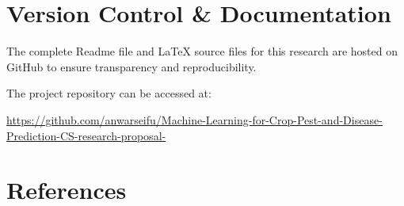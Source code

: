 \documentclass[12pt,a4paper]{article}
\begin{document}
\section{Version Control \& Documentation}

The complete Readme file and LaTeX source files for this research are hosted on GitHub to ensure transparency and reproducibility. 

The project repository can be accessed at:
\begin{flushleft}
    \footnotesize \url{https://github.com/anwarseifu/Machine-Learning-for-Crop-Pest-and-Disease-Prediction-CS-research-proposal-}
\end{flushleft}

\section{References}

\printbibliography[heading=none]
\end{document}
